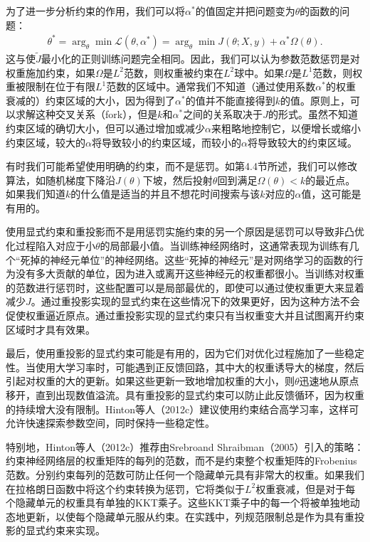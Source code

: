 为了进一步分析约束的作用，我们可以将$\alpha^*$的值固定并把问题变为$\theta$的函数的问题：
$$
\begin{aligned}
\theta^* = \arg_{\theta} \min \mathcal{L}(\theta, \alpha^*) = \arg_\theta \min J(\theta; X, y) + \alpha^* \Omega(\theta).
\end{aligned}
$$
这与使$\widetilde{J}$最小化的正则训练问题完全相同。因此，我们可以认为参数范数惩罚是对权重施加约束，如果$\Omega$是$L^2$范数，则权重被约束在$L^2$球中。如果$\Omega$是$L^1$范数，则权重被限制在位于有限$L^1$范数的区域中。通常我们不知道（通过使用系数$\alpha^*$的权重衰减的）约束区域的大小，因为得到了$\alpha^*$的值并不能直接得到$k$的值。原则上，可以求解这种交叉关系（fork），但是$k$和$\alpha^*$之间的关系取决于$J$的形式。虽然不知道约束区域的确切大小，但可以通过增加或减少$\alpha$来粗略地控制它，以便增长或缩小约束区域，较大的$\alpha$将导致较小的约束区域，而较小的$\alpha$将导致较大的约束区域。

有时我们可能希望使用明确的约束，而不是惩罚。如第4.4节所述，我们可以修改算法，如随机梯度下降沿$J(\theta)$下坡，然后投射$\theta$回到满足$\Omega (\theta) < k$的最近点。如果我们知道$k$的什么值是适当的并且不想花时间搜索与该$k$对应的$\alpha$值，这可能是有用的。

使用显式约束和重投影而不是用惩罚实施约束的另一个原因是惩罚可以导致非凸优化过程陷入对应于小$\theta$的局部最小值。当训练神经网络时，这通常表现为训练有几个“死掉的神经元单位”的神经网络。这些“死掉的神经元”是对网络学习的函数的行为没有多大贡献的单位，因为进入或离开这些神经元的权重都很小。当训练对权重的范数进行惩罚时，这些配置可以是局部最优的，即使可以通过使权重更大来显着减少$J$。通过重投影实现的显式约束在这些情况下的效果更好，因为这种方法不会促使权重逼近原点。通过重投影实现的显式约束只有当权重变大并且试图离开约束区域时才具有效果。

最后，使用重投影的显式约束可能是有用的，因为它们对优化过程施加了一些稳定性。当使用大学习率时，可能遇到正反馈回路，其中大的权重诱导大的梯度，然后引起对权重的大的更新。如果这些更新一致地增加权重的大小，则$\theta$迅速地从原点移开，直到出现数值溢流。具有重投影的显式约束可以防止此反馈循环，因为权重的持续增大没有限制。Hinton等人（2012c）建议使用约束结合高学习率，这样可允许快速探索参数空间，同时保持一些稳定性。

特别地，Hinton等人（2012c）推荐由Srebroand Shraibman（2005）引入的策略：约束神经网络层的权重矩阵的每列的范数，而不是约束整个权重矩阵的Frobenius范数。分别约束每列的范数可防止任何一个隐藏单元具有非常大的权重。如果我们在拉格朗日函数中将这个约束转换为惩罚，它将类似于$L^2$权重衰减，但是对于每个隐藏单元的权重具有单独的KKT乘子。这些KKT乘子中的每一个将被单独地动态地更新，以使每个隐藏单元服从约束。在实践中，列规范限制总是作为具有重投影的显式约束来实现。


